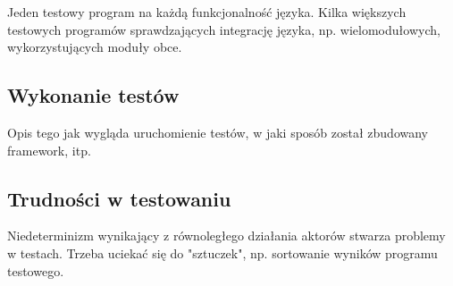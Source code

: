 Jeden testowy program na każdą funkcjonalność języka.
Kilka większych testowych programów sprawdzających integrację języka, np. wielomodułowych, wykorzystujących
moduły obce.

\subsection{Wykonanie testów}

Opis tego jak wygląda uruchomienie testów, w jaki sposób został zbudowany framework, itp.

\subsection{Trudności w testowaniu}

Niedeterminizm wynikający z równoległego działania aktorów stwarza problemy w testach. Trzeba uciekać się do
"sztuczek", np. sortowanie wyników programu testowego.


